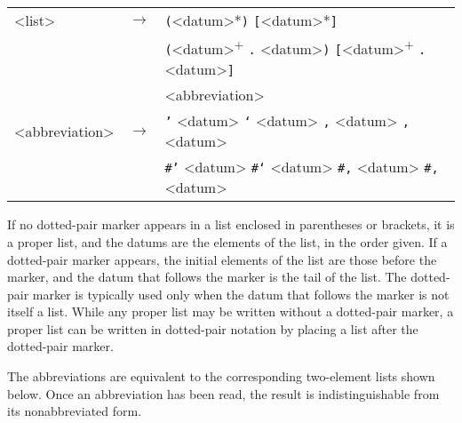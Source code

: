   
  
  {\footnotesize
\begin{tabular}[H]{lcl}

\textless{}list\textgreater{} & \(\longrightarrow\) & \texttt{(}\textless{}datum\textgreater{}*\texttt{)} \textbar{} \texttt{[}\textless{}datum\textgreater{}*\texttt{]} \\

   & \textbar{} & \texttt{(}\textless{}datum\textgreater{}\textsuperscript{+} \texttt{.} \textless{}datum\textgreater{}\texttt{)} \textbar{} \texttt{[}\textless{}datum\textgreater{}\textsuperscript{+} \texttt{.} \textless{}datum\textgreater{}\texttt{]} \\

   & \textbar{} & \textless{}abbreviation\textgreater{} \\

\textless{}abbreviation\textgreater{} & \(\longrightarrow\) & \texttt{'} \textless{}datum\textgreater{} \textbar{} \texttt{`} \textless{}datum\textgreater{} 
                       \textbar{} \texttt{,} \textless{}datum\textgreater{} \textbar{} \texttt{,\@{}} \textless{}datum\textgreater{} \\

 & \textbar{} & \texttt{\#{}'} \textless{}datum\textgreater{} \textbar{} \texttt{\#{}`} \textless{}datum\textgreater{} 
                       \textbar{} \texttt{\#{},} \textless{}datum\textgreater{} \textbar{} \texttt{\#{},\@{}} \textless{}datum\textgreater{}
 \\
\end{tabular}
}


If no dotted-pair marker appears in a list enclosed in parentheses or brackets,
it is a proper list, and the datums are the elements of the list, in the order
given.
If a dotted-pair marker appears, the initial elements of the list are those
before the marker, and the datum that follows the marker is the tail of the
list.
The dotted-pair marker is typically used only when the datum that follows
the marker is not itself a list.
While any proper list may be written without a dotted-pair marker, a
proper list can be written in dotted-pair notation by placing a list after
the dotted-pair marker.


The abbreviations are equivalent to the corresponding two-element lists
shown below. 
Once an abbreviation has been read, the result is indistinguishable from
its nonabbreviated form.


